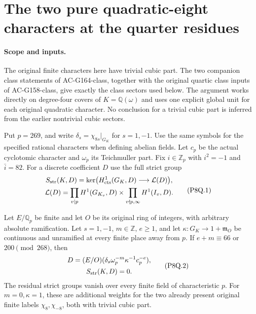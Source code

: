 \section{The two pure quadratic-eight characters at the quarter residues}
\label{sec:pure-quadratic8-quartic-strict}

\paragraph{Scope and inputs.}
The original finite characters here have trivial cubic part.
The two companion class statements of AC-G164-class, together
with the original quartic class inputs of AC-G158-class, give
exactly the class sectors used below.
The argument works directly on degree-four covers of
$K=\mathbb Q(\omega)$ and uses one explicit global unit for
each original quadratic character.
No conclusion for a trivial cubic part is inferred from the
earlier nontrivial cubic sectors.

Put $p=269$, and write
$\delta_s=\chi_{8s}|_{G_K}$ for $s=1,-1$.
Use the same symbols for the specified rational characters
when defining abelian fields.
Let $c_p$ be the actual cyclotomic character and $\omega_p$
its Teichmuller part.
Fix $i\in\mathbb Z_p$ with $i^2=-1$ and $\bar i=82$.
For a discrete coefficient $D$ use the full strict group
\[
 \begin{gathered}
 S_{\rm str}(K,D)=
 \ker\bigl(H^1_{\rm cts}(G_K,D)\longrightarrow\mathcal L(D)\bigr),\\
 \mathcal L(D)=
 \prod_{v\mid p}H^1(G_{K_v},D)
 \times\prod_{v\nmid p,\infty}H^1(I_v,D).
 \end{gathered}
 \tag{P8Q.1}
\]

\begin{theorem}
\label{AC-G164}
Let $E/\mathbb Q_p$ be finite and let $O$ be its original
ring of integers, with arbitrary absolute ramification.
Let $s=1,-1$, $m\in\mathbb Z$, $e\geq1$, and let
$\kappa:G_K\to1+\mathfrak m_O$ be continuous and unramified
at every finite place away from $p$.
If $e+m\equiv66$ or $200\pmod{268}$, then
\[
 \begin{gathered}
 D=(E/O)(\delta_s\omega_p^{-m}\kappa^{-1}c_p^{-e}),\\
                       S_{\rm str}(K,D)=0.
 \end{gathered}
 \tag{P8Q.2}
\]
The residual strict groups vanish over every finite field
of characteristic $p$.
For $m=0,\kappa=1$, these are additional weights for the
two already present original finite labels $\chi_8,\chi_{-8}$,
both with trivial cubic part.
\end{theorem}


